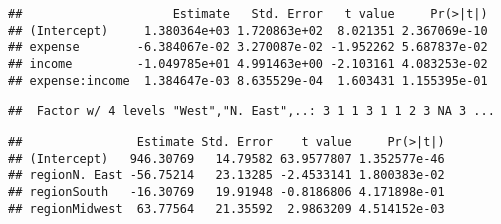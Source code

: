 \documentclass[]{article}
\newenvironment{Shaded}{\begin{snugshade}}{\end{snugshade}}
\newcommand{\KeywordTok}[1]{\textcolor[rgb]{0.13,0.29,0.53}{\textbf{#1}}}
\newcommand{\DataTypeTok}[1]{\textcolor[rgb]{0.13,0.29,0.53}{#1}}
\newcommand{\StringTok}[1]{\textcolor[rgb]{0.31,0.60,0.02}{#1}}
\newcommand{\CommentTok}[1]{\textcolor[rgb]{0.56,0.35,0.01}{\textit{#1}}}
\newcommand{\OperatorTok}[1]{\textcolor[rgb]{0.81,0.36,0.00}{\textbf{#1}}}
\newcommand{\NormalTok}[1]{#1}
\begin{document}
\begin{verbatim}
##                     Estimate   Std. Error   t value     Pr(>|t|)
## (Intercept)     1.380364e+03 1.720863e+02  8.021351 2.367069e-10
## expense        -6.384067e-02 3.270087e-02 -1.952262 5.687837e-02
## income         -1.049785e+01 4.991463e+00 -2.103161 4.083253e-02
## expense:income  1.384647e-03 8.635529e-04  1.603431 1.155395e-01
\end{verbatim}

\begin{Shaded}
\end{Shaded}

\begin{verbatim}
##  Factor w/ 4 levels "West","N. East",..: 3 1 1 3 1 1 2 3 NA 3 ...
\end{verbatim}

\begin{Shaded}
\end{Shaded}

\begin{verbatim}
##                Estimate Std. Error    t value     Pr(>|t|)
## (Intercept)   946.30769   14.79582 63.9577807 1.352577e-46
## regionN. East -56.75214   23.13285 -2.4533141 1.800383e-02
## regionSouth   -16.30769   19.91948 -0.8186806 4.171898e-01
## regionMidwest  63.77564   21.35592  2.9863209 4.514152e-03
\end{verbatim}
\end{document}
